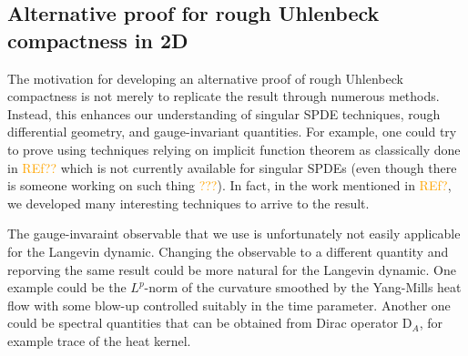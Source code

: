 \documentclass[12pt]{article}
\numberwithin{equation}{section}
\theoremstyle{definition}
\theoremstyle{remark}
\newcommand{\diff}{\mathrm{d}}
\newcommand{\1}{\mathbf 1}
\newcommand{\<}{\langle}
\renewcommand{\>}{\rangle}
\newcommand{\orange}[1]{\textcolor{orange}{#1}}
\newcommand{\rmD}{\mathrm{D}}
\begin{document}




\subsection{Alternative proof for rough Uhlenbeck compactness in 2D}




The motivation for developing an alternative proof of rough Uhlenbeck compactness is not merely to replicate the result through numerous methods. Instead, this enhances our understanding of singular SPDE techniques, rough differential geometry, and gauge-invariant quantities. For example, one could try to prove using techniques relying on implicit function theorem as classically done in \orange{REf??} which is not currently available for singular SPDEs (even though there is someone working on such thing \orange{???}). In fact, in the work mentioned in \orange{REf?}, we developed many interesting techniques to arrive to the result. 

The gauge-invaraint observable that we use is unfortunately not easily applicable for the Langevin dynamic. Changing the observable to a different quantity and reporving the same result could be more natural for the Langevin dynamic. One example could be the $L^p$-norm of the curvature smoothed by the Yang-Mills heat flow with some blow-up controlled suitably in the time parameter. Another one could be spectral quantities that can be obtained from Dirac operator $\rmD_A$, for example trace of the heat kernel. 
\end{document}
